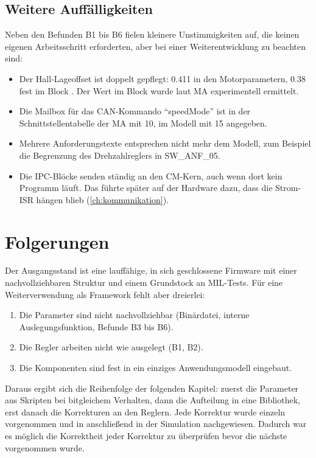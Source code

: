 \subsection*{Weitere Auffälligkeiten}

Neben den Befunden B1 bis B6 fielen kleinere Unstimmigkeiten auf, die keinen eigenen
Arbeitsschritt erforderten, aber bei einer Weiterentwicklung zu beachten sind:

\begin{itemize}
  \item Der Hall-Lageoffset ist doppelt gepflegt: \num{0,411} in den Motorparametern,
    \num{0,38} fest im Block . Der Wert im Block
    wurde laut \ac{MA} experimentell ermittelt.
  \item Die Mailbox für das CAN-Kommando \enquote{speedMode} ist in der
    Schnittstellentabelle der \ac{MA} mit 10, im Modell mit 15 angegeben.
  \item Mehrere Anforderungstexte entsprechen nicht mehr dem Modell, zum Beispiel die
    Begrenzung des Drehzahlreglers in SW\_ANF\_05.
  \item Die \ac{IPC}-Blöcke senden ständig an den \ac{CM}-Kern, auch wenn dort kein Programm
    läuft. Das führte später auf der Hardware dazu, dass die Strom-\ac{ISR} hängen blieb
    (\cref{ch:kommunikation}).
\end{itemize}

\section{Folgerungen}
\label{sec:folgerungen}

Der Ausgangsstand ist eine lauffähige, in sich geschlossene Firmware mit einer
nachvollziehbaren Struktur und einem Grundstock an \ac{MIL}-Tests. Für eine
Weiterverwendung als Framework fehlt aber dreierlei: 
\begin{enumerate}
	\item Die Parameter sind nicht
	nachvollziehbar (Binärdatei, interne Auslegungsfunktion, Befunde B3 bis B6).
	\item Die Regler
	arbeiten nicht wie ausgelegt (B1, B2).
	\item Die Komponenten sind fest in ein einziges
	Anwendungsmodell eingebaut.
\end{enumerate}
 Daraus ergibt sich die Reihenfolge der folgenden Kapitel:
zuerst die Parameter aus Skripten bei bitgleichem Verhalten, dann die Aufteilung in eine
Bibliothek, erst danach die Korrekturen an den Reglern. Jede Korrektur wurde einzeln vorgenommen und in anschließend in der Simulation nachgewiesen.
Dadurch war es möglich die Korrektheit jeder Korrektur zu überprüfen bevor die nächste vorgenommen wurde.
